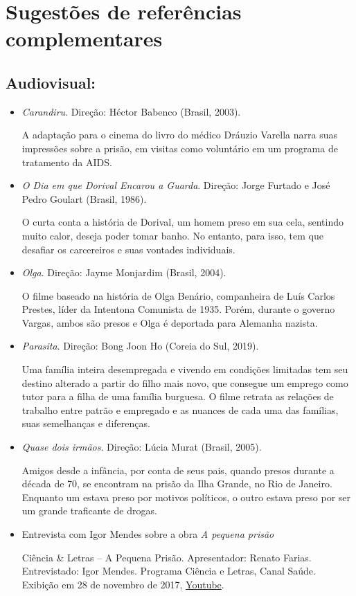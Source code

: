 \documentclass[11pt]{extarticle}
\begin{document}
\section{Sugestões de referências complementares}

\subsection{Audiovisual:}

\begin{itemize}
\item\textit{Carandiru}. Direção: Héctor Babenco (Brasil, 2003).

A adaptação para o cinema do livro do médico Dráuzio Varella narra suas 
impressões sobre a prisão, em visitas como voluntário em um programa 
de tratamento da AIDS.

\item\textit{O Dia em que Dorival Encarou a Guarda}. Direção: Jorge Furtado e José Pedro Goulart (Brasil, 1986).

O curta conta a história de Dorival, um homem preso em sua cela, 
sentindo muito calor, deseja poder tomar banho. No entanto, 
para isso, tem que desafiar os carcereiros e suas vontades 
individuais.

\item\textit{Olga}. Direção: Jayme Monjardim (Brasil, 2004).

O filme baseado na história de Olga Benário, companheira de Luís 
Carlos Prestes, líder da Intentona Comunista de 1935. Porém, durante 
o governo Vargas, ambos são presos e Olga é deportada para Alemanha 
nazista.

\item\textit{Parasita}. Direção: Bong Joon Ho (Coreia do Sul, 2019).

Uma família inteira desempregada e vivendo em condições limitadas tem 
seu destino alterado a partir do filho mais novo, que consegue um emprego 
como tutor para a filha de uma família burguesa. O filme retrata as relações 
de trabalho entre patrão e empregado e as nuances de cada uma das famílias, 
suas semelhanças e diferenças.

\item\textit{Quase dois irmãos}. Direção: Lúcia Murat (Brasil, 2005).

Amigos desde a infância, por conta de seus pais, quando presos durante 
a década de 70, se encontram na prisão da Ilha Grande, no Rio de Janeiro. 
Enquanto um estava preso por motivos políticos, o outro estava preso por 
ser um grande traficante de drogas.

\item Entrevista com Igor Mendes sobre a obra \emph{A pequena prisão}

Ciência \& Letras -- A Pequena Prisão. 
Apresentador: Renato Farias. Entrevistado: Igor Mendes. 
Programa Ciência e Letras, Canal Saúde. Exibição em 28 de novembro de 2017, \href{youtube.com/kwLs4aImRRM}{{Youtube}}.
\end{itemize}
\end{document}
